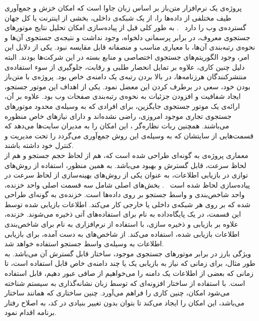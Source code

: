 
پروژه‌ی  یک نرم‌افزار متن‌باز بر اساس زبان جاوا است که امکان خزش و جمع‌آوری طیف مختلفی از داده‌ها را، از یک شبکه‌ی داخلی، بخشی از اینترنت یا کل جهان گسترده‌ی وب را دارد
~\cite{Nutch-java}.
به طور کلی قبل از پیاده‌سازی  امکان تحلیل نتایج موتورهای جستجوی معروف، در برابر پرسمانی دلخواه، وجود نداشت و نتیجه‌ی جستجوی آن‌ها و نحوه‌ی رتبه‌بندی آن‌ها، با معیاری مناسب و منصفانه قابل مقایسه نبود. یکی از دلایل این امر، وجود الگوریتم‌های جستجوی اختصاصی و منابع بسته در این شرکت‌ها بودند. البته دلیل چنین کاری، علاوه بر تمایل انحصار طلبی و رقابت، جلوگیری از سوء استفاده‌ی منتشرکنندگان هرزنامه‌ها، در بالا بردن رتبه‌ی یک دامنه‌ی خاص بود. پروژه‌ی  با متن‌باز بودن خود، سعی در برطرف کردن این معضل نمود. یکی از اهداف این موتور جستجو، ایجاد شفافیت و افزودن جزئیات به نحوه‌ی رتبه‌بندی صفحات وب بود. علاوه بر آن، ارائه‌ی یک موتور جستجوی جایگزین، برای افرادی که به وسیله‌ی محدود موتورهای جستجوی تجاری موجود امروزی، راضی نشده‌اند و دارای نیاز‌های خاص منظوره می‌باشند. همچنین ربات نظاره‌گر ، این امکان را به مدیران سایت‌ها می‌دهد که قسمت‌هایی از سایتشان که به وسیله‌ی این روش جمع‌آوری می‌گردد را تحت مدیریت و کنترل خود داشته باشند.
\\
معماری پروژه‌ی  به گونه‌ای طراحی شده است که، هم از لحاظ حجم جستجو و هم از لحاظ سرعت، قابل گسترش و بهبود می‌باشد. به همین منظور، استفاده از روش‌های توازی در بازیابی اطلاعات، به عنوان یکی از روش‌های بهینه‌سازی از لحاظ سرعت در پیاده‌سازی لحاظ شده است
~\cite{Nutch-java}.
بخش‌های اصلی  شامل سه قسمت اصلی واحد خزنده، واحد شاخص‌بندی و واسط جستجو بر روی داده‌ها است. خزنده‌ی  به گونه‌ای طراحی شده که بر روی هر شبکه‌ی داخلی یا خارجی کار می‌کند. اطلاعات بازیابی شده توسط این قسمت، در یک پایگاه‌داده به نام  برای استفاده‌های آتی ذخیره می‌شوند. خزنده، علاوه بر بازیابی و ذخیره سازی، با استفاده از نرم‌افزاری به نام  برای شاخص‌بندی اطلاعات بازیابی شده، استفاده می‌کند. از شاخص‌های به دست آمده، برای بازیابی اطلاعات به وسیله‌ی واسط جستجو استفاده خواهد شد.
\\ویژگی بارز  در برابر موتورهای جستجوی موجود، ساختار قابل گسترش آن می‌باشد. به طور مثال،  برای زمانی که نیاز به بازیابی یک یا چند دامنه‌ی خاص قابل استفاده است، تا زمانی که بعضی از اطلاعات یک دامنه را می‌خواهیم از صافی عبور دهیم، قابل استفاده است.  با استفاده از ساختار افزونه‌ای که توسط زبان نشانه‌گذاری به سیستم شناخته می‌شود امکان، چنین کاری را فراهم می‌آورد. چنین ساختاری که همانند ساختار  می‌باشد، این امکان را ایجاد می‌کند تا بتوان بدون تغییر بنیادی در کد، به اصلاح رفتار برنامه اقدام نمود.

